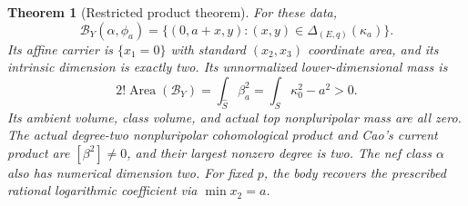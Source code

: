 \documentclass[11pt]{article}
\newtheorem{theorem}{Theorem}
\newcommand{\Area}{\operatorname{Area}}
\newcommand{\B}{\mathcal B}
\begin{document}
\begin{theorem}[Restricted product theorem]
For these data,
\[
 \B_Y(\alpha,\phi_a)=
 \{(0,a+x,y):(x,y)\in\Delta_{(E,q)}(\kappa_a)\}. \tag{3.3}
\]
Its affine carrier is $\{x_1=0\}$ with standard $(x_2,x_3)$ coordinate area, and its intrinsic dimension is exactly two. Its unnormalized lower-dimensional mass is
\[
 2!\Area(\B_Y)=\int_{\widehat S}\beta_a^2
              =\int_S\kappa_0^2-a^2>0. \tag{3.4}
\]
Its ambient volume, class volume, and actual top nonpluripolar mass are all zero. The actual degree-two nonpluripolar cohomological product and Cao's current product are $[\beta^2]\ne0$, and their largest nonzero degree is two. The nef class $\alpha$ also has numerical dimension two. For fixed $p$, the body recovers the prescribed rational logarithmic coefficient via $\min x_2=a$.
\end{theorem}
\end{document}
